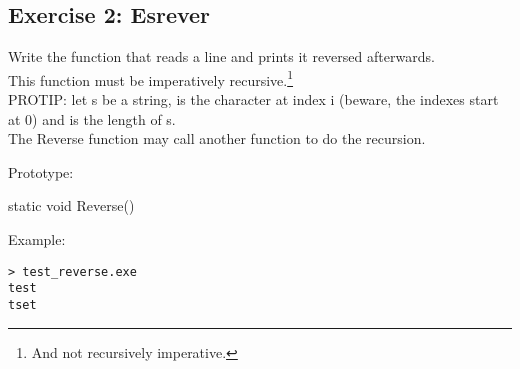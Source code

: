 \subsection{Exercise 2: Esrever}

Write the  function that reads a line and prints it reversed afterwards.\\
This function must be imperatively recursive.\footnote{And not recursively imperative.}\\
PROTIP: let s be a string,  is the character at index i (beware, the indexes start at 0)
and  is the length of s.\\
The Reverse function may call another function to do the recursion.

Prototype:
\begin{code}
static void Reverse()
\end{code}

Example:
\begin{verbatim}
> test_reverse.exe
test
tset
\end{verbatim}
